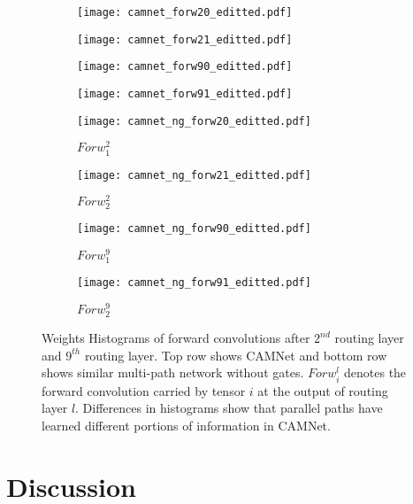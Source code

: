 \documentclass[10pt,twocolumn,letterpaper]{article}
\begin{document}
\begin{figure}[htbp]
	\begin{center}
		\begin{subfigure}[]{0.24\linewidth}
			\texttt{[image: camnet\_forw20\_editted.pdf]} 
		\end{subfigure}
		\begin{subfigure}[]{0.24\linewidth}
			\texttt{[image: camnet\_forw21\_editted.pdf]}
		\end{subfigure}
		\begin{subfigure}[]{0.24\linewidth}
			\texttt{[image: camnet\_forw90\_editted.pdf]}
		\end{subfigure}
		\begin{subfigure}[]{0.24\linewidth}
			\texttt{[image: camnet\_forw91\_editted.pdf]}
		\end{subfigure}
		
		\begin{subfigure}[]{0.24\linewidth}
			\texttt{[image: camnet\_ng\_forw20\_editted.pdf]}
			\caption{$Forw^2_1$} 
		\end{subfigure}
		\begin{subfigure}[]{0.24\linewidth}
			\texttt{[image: camnet\_ng\_forw21\_editted.pdf]}
			\caption{$Forw^2_2$}
		\end{subfigure}
		\begin{subfigure}[]{0.24\linewidth}
			\texttt{[image: camnet\_ng\_forw90\_editted.pdf]}
			\caption{$Forw^9_1$}
		\end{subfigure}
		\begin{subfigure}[]{0.24\linewidth}
			\texttt{[image: camnet\_ng\_forw91\_editted.pdf]}
			\caption{$Forw^9_2$}
		\end{subfigure}
	\end{center}
	\vspace{-0.2in}
	\caption{Weights Histograms of forward convolutions after $2^{nd}$ routing layer and $9^{th}$ routing layer. Top row shows CAMNet and bottom row shows similar multi-path network without gates. $Forw^l_i$ denotes the forward convolution carried by tensor $i$ at the output of routing layer $l$. Differences in histograms show that parallel paths have learned different portions of information in CAMNet.}
	\label{fig:histograms}
	\vspace{-0.1in}
\end{figure}


\section{Discussion}
\label{se:discussion}
\vspace{-0.05in}
\end{document}
